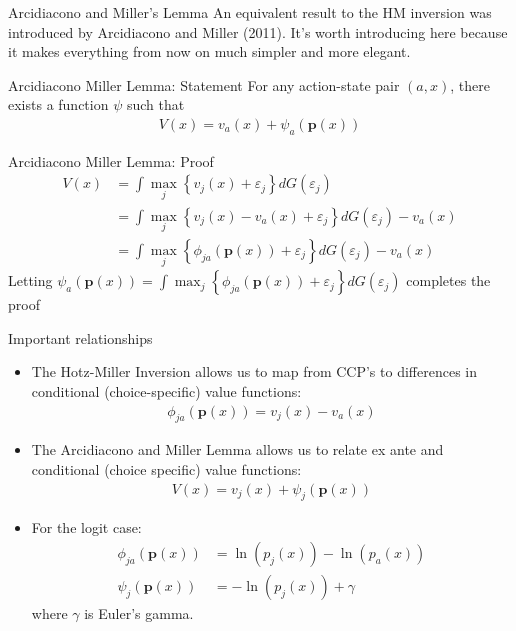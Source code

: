 \begin{frame}{Arcidiacono and Miller's Lemma}
An equivalent result to the HM inversion was introduced by Arcidiacono and Miller (2011). 
It's worth introducing here because it makes everything from now on much simpler
and more elegant.
\begin{block}{Arcidiacono Miller Lemma: Statement}
For any action-state pair $\left(a,x\right)$, there exists a function
$\psi$ such that 
\begin{align*}
V\left(x\right)=v_{a}\left(x\right)+\psi_{a}\left(\mathbf{p}\left(x\right)\right)
\end{align*}
\end{block}
\end{frame}

\begin{frame}{Arcidiacono Miller Lemma: Proof}
\begin{align*}
V\left(x\right) &=  \int\max_{j}\left\{ v_{j}\left(x\right)+\varepsilon_{j}\right\} dG\left(\varepsilon_{j}\right)\\
 &= \int\max_{j}\left\{ v_{j}\left(x\right)-v_{a}\left(x\right)+\varepsilon_{j}\right\} dG\left(\varepsilon_{j}\right)-v_{a}\left(x\right)\\
 &=  \int\max_{j}\left\{ \phi_{ja}\left(\mathbf{p}\left(x\right)\right)+\varepsilon_{j}\right\} dG\left(\varepsilon_{j}\right)-v_{a}\left(x\right)
\end{align*}
Letting $\psi_{a}\left(\mathbf{p}\left(x\right)\right)=\int\max_{j}\left\{ \phi_{ja}\left(\mathbf{p}\left(x\right)\right)+\varepsilon_{j}\right\} dG\left(\varepsilon_{j}\right)$ completes the proof
\end{frame}

\begin{frame}{Important relationships}
\small
\begin{itemize}
\item The Hotz-Miller Inversion allows us to map from CCP's to differences
in conditional (choice-specific) value functions:
\begin{align*}
\phi_{ja}\left(\mathbf{p}\left(x\right)\right)=v_{j}\left(x\right)-v_{a}\left(x\right)
\end{align*}
\item The Arcidiacono and Miller Lemma allows us to relate ex ante and conditional (choice specific)
value functions: 
\begin{align*}
V\left(x\right)=v_{j}\left(x\right)+\psi_{j}\left(\mathbf{p}\left(x\right)\right)
\end{align*}
\item For the logit case:
\begin{align*}
\phi_{ja}\left(\mathbf{p}\left(x\right)\right) & = \ln\left(p_{j}\left(x\right)\right)-\ln\left(p_{a}\left(x\right)\right)\\
\psi_{j}\left(\mathbf{p}\left(x\right)\right) & =  -\ln\left(p_{j}\left(x\right)\right)+\gamma
\end{align*}
where $\gamma$ is Euler's gamma.
\end{itemize}
\end{frame}



